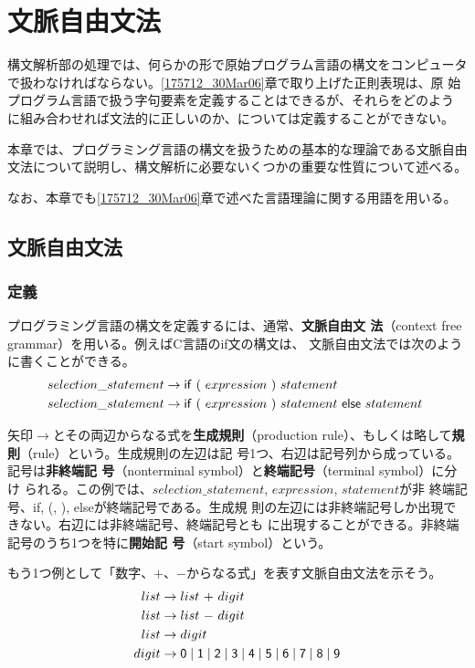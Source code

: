 
\chapter{文脈自由文法}
\label{151253_30Mar06}

構文解析部の処理では、何らかの形で原始プログラム言語の構文をコンピュータ
で扱わなければならない。\ref{175712_30Mar06}章で取り上げた正則表現は、原
始プログラム言語で扱う字句要素を定義することはできるが、それらをどのよう
に組み合わせれば文法的に正しいのか、については定義することができない。

本章では、プログラミング言語の構文を扱うための基本的な理論である文脈自由
文法について説明し、構文解析に必要ないくつかの重要な性質について述べる。

なお、本章でも\ref{175712_30Mar06}章で述べた言語理論に関する用語を用いる。

\section{文脈自由文法}

\subsection{定義}

プログラミング言語の構文を定義するには、通常、{\bfseries 文脈自由文
法}（context free grammar）を用いる。例えばC言語のif文の構文は、
文脈自由文法では次のように書くことができる。
\begin{align*}
 selection\_statement & \rightarrow {\sf if}\ {\sf (}\ expression\ 
  {\sf )}\ statement \\
 selection\_statement & \rightarrow {\sf if}\ {\sf (}\ expression\ 
  {\sf )}\ statement\ 
 {\sf else}\ statement\ 
\end{align*}

矢印$\rightarrow$とその両辺からなる式を{\bfseries 生成規則}（production
rule）、もしくは略して{\bfseries 規則}（rule）という。生成規則の左辺は記
号1つ、右辺は記号列から成っている。記号は{\bfseries 非終端記
号}（nonterminal symbol）と{\bfseries 終端記号}（terminal symbol）に分け
られる。この例では、$selection\_statement$, $expression$, $statement$が非
終端記号、{\sf if}, {\sf (}, {\sf )}, {\sf else}が終端記号である。生成規
則の左辺には非終端記号しか出現できない。右辺には非終端記号、終端記号とも
に出現することができる。非終端記号のうち1つを特に{\bfseries 開始記
号}（start symbol）という。

もう1つ例として「数字、$+$、$-$からなる式」を表す文脈自由文法を示そう。
\begin{equation}
 \begin{split}
 list & \rightarrow list\ {\sf +}\ digit \\
 list & \rightarrow list\ {\sf -}\ digit \\
 list & \rightarrow digit \\
 digit & \rightarrow {\sf 0} \mid {\sf 1} \mid {\sf 2} \mid {\sf 3}
  \mid {\sf 4} \mid {\sf 5} \mid {\sf 6} \mid
  {\sf 7} \mid {\sf 8} \mid {\sf 9}
 \end{split}\label{171007_30Mar06}
\end{equation}

